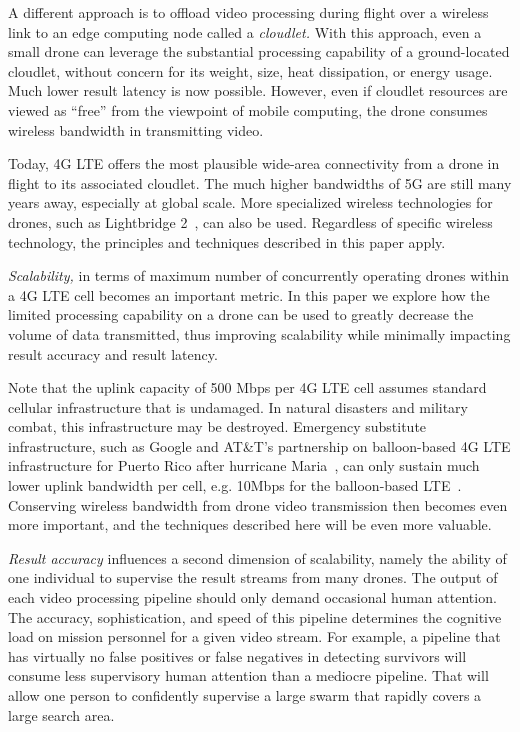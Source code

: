 A different approach is to offload video processing during flight over
a wireless link to an edge computing node called a {\em cloudlet.}
With this approach, even a small drone can leverage the substantial
processing capability of a ground-located cloudlet, without concern
for its weight, size, heat dissipation, or energy usage.  Much lower
result latency is now possible.  However, even if cloudlet resources
are viewed as ``free'' from the viewpoint of mobile computing, the
drone consumes wireless bandwidth in transmitting video.  

Today, 4G LTE offers the most plausible wide-area connectivity from a
drone in flight to its associated cloudlet.  The much higher
bandwidths of 5G are still many years away, especially at global
scale.  More specialized wireless technologies for drones, such as
Lightbridge 2~\cite{LightBridge2}, can also be used.  Regardless of
specific wireless technology, the principles and techniques described
in this paper apply.

{\em Scalability,} in terms of maximum number of concurrently
operating drones within a 4G LTE cell becomes an important metric.  In
this paper we explore how the limited processing capability on a drone
can be used to greatly decrease the volume of data transmitted, thus
improving scalability while minimally impacting result accuracy and
result latency.

Note that the uplink capacity of 500 Mbps per 4G LTE cell assumes standard
cellular infrastructure that is undamaged.  In natural disasters and military
combat, this infrastructure may be destroyed. Emergency substitute
infrastructure, such as Google and AT\&T's partnership on balloon-based 4G LTE
infrastructure for Puerto Rico after hurricane Maria~\cite{Morse2017}, can only
sustain much lower uplink bandwidth per cell, e.g. 10Mbps for the balloon-based
LTE~\cite{Sankaran2018}.  Conserving wireless bandwidth from drone video
transmission then becomes even more important, and the techniques described here
will be even more valuable.

\emph{Result accuracy} influences a second dimension of scalability, namely
the ability of one individual to supervise the result streams from
many drones.  The output of each video processing pipeline should only
demand occasional human attention.  The accuracy, sophistication, and
speed of this pipeline determines the cognitive load on mission
personnel for a given video stream.  For example, a pipeline that has
virtually no false positives or false negatives in detecting survivors
will consume less supervisory human attention than a mediocre
pipeline.  That will allow one person to confidently supervise a large
swarm that rapidly covers a large search area.
